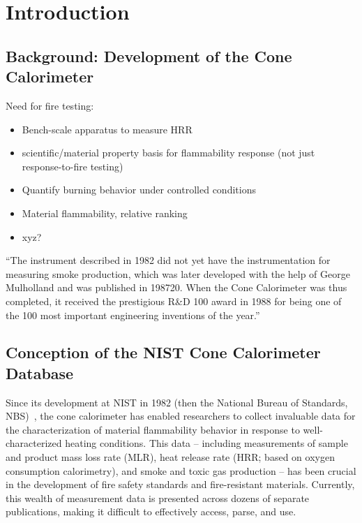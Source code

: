 
\section{Introduction} \label{sec:intro}
\subsection{Background: Development of the Cone Calorimeter} \label{ssec:intro-background}
Need for fire testing:
\begin{itemize}
\item Bench-scale apparatus to measure HRR
\item scientific/material property basis for flammability response (not just response-to-fire testing)
\item Quantify burning behavior under controlled conditions
\item Material flammability, relative ranking
\item xyz?
\end{itemize}

``The instrument described in 1982 did not yet have the instrumentation for measuring smoke production, which was later developed with the help of George Mulholland and was published in 198720. When the Cone Calorimeter was thus completed, it received the prestigious R\&D 100 award in 1988 for being one of the 100 most important engineering inventions of the year.''

\subsection{Conception of the NIST Cone Calorimeter Database} \label{ssec:intro-concept}
Since its development at NIST in 1982 (then the National Bureau of Standards, NBS)~\cite{babrauskas1982nbs}, the cone calorimeter has enabled researchers to collect invaluable data for the characterization of material flammability behavior in response to well-characterized heating conditions. This data – including measurements of sample and product mass loss rate (MLR), heat release rate (HRR; based on oxygen consumption calorimetry), and smoke and toxic gas production – has been crucial in the development of fire safety standards and fire-resistant materials. Currently, this wealth of measurement data is presented across dozens of separate publications, making it difficult to effectively access, parse, and use.

